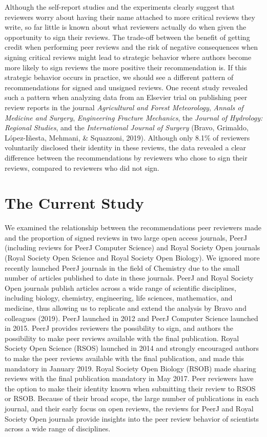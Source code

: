 \documentclass[
  english,
  ,jou, a4paper,floatsintext]{apa6}
\begin{document}
Although the self-report studies and the experiments clearly suggest that reviewers worry about having their name attached to more critical reviews they write, so far little is known about what reviewers actually do when given the opportunity to sign their reviews. The trade-off between the benefit of getting credit when performing peer reviews and the risk of negative consequences when signing critical reviews might lead to strategic behavior where authors become more likely to sign reviews the more positive their recommendation is. If this strategic behavior occurs in practice, we should see a different pattern of recommendations for signed and unsigned reviews. One recent study revealed such a pattern when analyzing data from an Elsevier trial on publishing peer review reports in the journal \emph{Agricultural and Forest Meteorology}, \emph{Annals of Medicine and Surgery}, \emph{Engineering Fracture Mechanics}, the \emph{Journal of Hydrology: Regional Studies}, and the \emph{International Journal of Surgery} (Bravo, Grimaldo, López-Iñesta, Mehmani, \& Squazzoni, 2019). Although only 8.1\% of reviewers voluntarily disclosed their identity in these reviews, the data revealed a clear difference between the recommendations by reviewers who chose to sign their reviews, compared to reviewers who did not sign.

\hypertarget{the-current-study}{%
\section{The Current Study}\label{the-current-study}}

We examined the relationship between the recommendations peer reviewers made and the proportion of signed reviews in two large open access journals, PeerJ (including reviews for PeerJ Computer Science) and Royal Society Open journals (Royal Society Open Science and Royal Society Open Biology). We ignored more recently launched PeerJ journals in the field of Chemistry due to the small number of articles published to date in these journals. PeerJ and Royal Society Open journals publish articles across a wide range of scientific disciplines, including biology, chemistry, engineering, life sciences, mathematics, and medicine, thus allowing us to replicate and extend the analysis by Bravo and colleagues (2019). PeerJ launched in 2012 and PeerJ Computer Science launched in 2015. PeerJ provides reviewers the possibility to sign, and authors the possibility to make peer reviews available with the final publication. Royal Society Open Science (RSOS) launched in 2014 and strongly encouraged authors to make the peer reviews available with the final publication, and made this mandatory in January 2019. Royal Society Open Biology (RSOB) made sharing reviews with the final publication mandatory in May 2017. Peer reviewers have the option to make their identity known when submitting their review to RSOS or RSOB. Because of their broad scope, the large number of publications in each journal, and their early focus on open reviews, the reviews for PeerJ and Royal Society Open journals provide insights into the peer review behavior of scientists across a wide range of disciplines.
\end{document}
